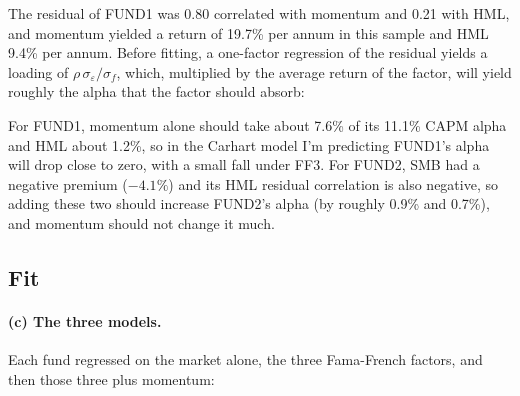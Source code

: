 \documentclass[11pt]{article}
\newcommand{\tbl}[1]{}
\begin{document}
\begin{table}[H]
\centering\small
\caption{Correlation of each fund's CAPM residual with the omitted factors.}
\tbl{p5_resid_corr}
\end{table}

\begin{table}[H]
\centering\small
\caption{Average returns, \% a year: fund sample and the last ten years of the files.}
\label{tab:p5premia}
\tbl{p5_premia}
\end{table}

The residual of FUND1 was 0.80 correlated with momentum and 0.21 with HML, and momentum yielded a return of 19.7\% per annum in this sample and HML 9.4\% per annum. Before fitting, a one-factor regression of the residual yields a loading of $\rho\,\sigma_\varepsilon/\sigma_f$, which, multiplied by the average return of the factor, will yield roughly the alpha that the factor should absorb:

\begin{table}[H]
\centering\small
\caption{Rough pre-fit loadings and the change in alpha they imply (each factor on its own).}
\tbl{p5_guess}
\end{table}

For FUND1, momentum alone should take about 7.6\% of its 11.1\% CAPM alpha and HML about 1.2\%, so in the Carhart model I'm predicting FUND1's alpha will drop close to zero, with a small fall under FF3. For FUND2, SMB had a negative premium ($-4.1\%$) and its HML residual correlation is also negative, so adding these two should increase FUND2's alpha (by roughly 0.9\% and 0.7\%), and momentum should not change it much.

\subsection*{Fit}

\paragraph{(c) The three models.} Each fund regressed on the market alone, the three Fama-French factors, and then those three plus momentum:

\begin{table}[H]
\centering
\caption{CAPM, Fama-French 3 and Carhart 4 factor fits. Alpha in bp per day; standard errors in parentheses.}
\label{tab:p5models}
\resizebox{\textwidth}{!}{\tbl{p5_models}}
\end{table}
\end{document}
